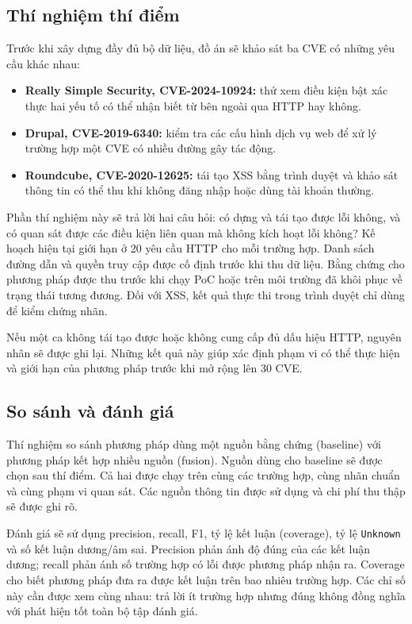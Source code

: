 \documentclass[11pt,a4paper]{article}
\begin{document}
\subsection{Thí nghiệm thí điểm}

Trước khi xây dựng đầy đủ bộ dữ liệu, đồ án sẽ khảo sát ba CVE có những yêu cầu khác nhau:
\begin{itemize}
  \item \textbf{Really Simple Security, CVE-2024-10924:} thử xem điều kiện bật xác thực hai yếu tố có thể nhận biết từ bên ngoài qua HTTP hay không.
  \item \textbf{Drupal, CVE-2019-6340:} kiểm tra các cấu hình dịch vụ web để xử lý trường hợp một CVE có nhiều đường gây tác động.
  \item \textbf{Roundcube, CVE-2020-12625:} tái tạo XSS bằng trình duyệt và khảo sát thông tin có thể thu khi không đăng nhập hoặc dùng tài khoản thường.
\end{itemize}

Phần thí nghiệm này sẽ trả lời hai câu hỏi: có dựng và tái tạo được lỗi không, và có quan sát được các điều kiện liên quan mà không kích hoạt lỗi không? Kế hoạch hiện tại giới hạn ở 20 yêu cầu HTTP cho mỗi trường hợp. Danh sách đường dẫn và quyền truy cập được cố định trước khi thu dữ liệu. Bằng chứng cho phương pháp được thu trước khi chạy PoC hoặc trên môi trường đã khôi phục về trạng thái tương đương. Đối với XSS, kết quả thực thi trong trình duyệt chỉ dùng để kiểm chứng nhãn.

Nếu một ca không tái tạo được hoặc không cung cấp đủ dấu hiệu HTTP, nguyên nhân sẽ được ghi lại. Những kết quả này giúp xác định phạm vi có thể thực hiện và giới hạn của phương pháp trước khi mở rộng lên 30 CVE.

\subsection{So sánh và đánh giá}

Thí nghiệm so sánh phương pháp dùng một nguồn bằng chứng (baseline) với phương pháp kết hợp nhiều nguồn (fusion). Nguồn dùng cho baseline sẽ được chọn sau thí điểm. Cả hai được chạy trên cùng các trường hợp, cùng nhãn chuẩn và cùng phạm vi quan sát. Các nguồn thông tin được sử dụng và chi phí thu thập sẽ được ghi rõ.

Đánh giá sẽ sử dụng precision, recall, F1, tỷ lệ kết luận (coverage), tỷ lệ \texttt{Unknown} và số kết luận dương/âm sai. Precision phản ánh độ đúng của các kết luận dương; recall phản ánh số trường hợp có lỗi được phương pháp nhận ra. Coverage cho biết phương pháp đưa ra được kết luận trên bao nhiêu trường hợp. Các chỉ số này cần được xem cùng nhau: trả lời ít trường hợp nhưng đúng không đồng nghĩa với phát hiện tốt toàn bộ tập đánh giá.
\end{document}
